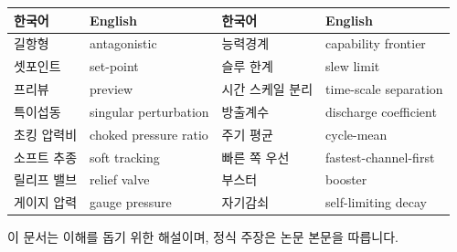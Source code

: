 \documentclass[11pt]{article}
\begin{document}
\begin{table}[h]
\centering\small
\begin{tabular}{@{}llll@{}}
\toprule
한국어 & English & 한국어 & English\\
\midrule
길항형 & antagonistic & 능력경계 & capability frontier\\
셋포인트 & set-point & 슬루 한계 & slew limit\\
프리뷰 & preview & 시간 스케일 분리 & time-scale separation\\
특이섭동 & singular perturbation & 방출계수 & discharge coefficient\\
초킹 압력비 & choked pressure ratio & 주기 평균 & cycle-mean\\
소프트 추종 & soft tracking & 빠른 쪽 우선 & fastest-channel-first\\
릴리프 밸브 & relief valve & 부스터 & booster\\
게이지 압력 & gauge pressure & 자기감쇠 & self-limiting decay\\
\bottomrule
\end{tabular}
\end{table}

\vfill
\begin{center}\small\color{gray}
이 문서는 이해를 돕기 위한 해설이며, 정식 주장은 논문 본문을 따릅니다.
\end{center}
\end{document}

